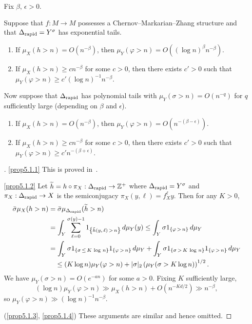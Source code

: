 \documentclass[10pt]{amsart}
\theoremstyle{definition}\newtheorem{defi}[theo]{Definition}\newtheorem{rema}[theo]{Remark}\newtheorem{exam}[theo]{Example}\newtheorem{exem}[theo]{Example}\newtheorem{nota}[theo]{Notation}
\newcommand{\Z}{\mathbb{Z}}
\newcommand{\DE}{\Delta_{\rm rapid}}
\newcommand{\eps}{\epsilon}
\newcommand*{\alphenumi}{\renewcommand*{\theenumi}{\alph{enumi}}}
\let\oldtilde\tilde
\renewcommand*{\tilde}[1]{\mathchoice{\widetilde{#1}}{\widetilde{#1}}{\oldtilde{#1}}{\oldtilde{#1}}}
\newenvironment{proofc}[1][\proofname]{\begin{proof}[#1]}{\end{proof}}
\begin{document}
\begin{prop}\label{prop:rough}
Fix $\beta,\,\eps>0$.

Suppose that $f:M\to M$ possesses a Chernov--Markarian--Zhang structure and that $\DE=Y^\sigma$ has exponential tails.
\begin{enumerate}\alphenumi
\item \label{prop5.1.1}If $\mu_X(h>n)=O(n^{-\beta})$, then $\mu_Y(\varphi>n)=O((\log n)^\beta n^{-\beta})$.
\item \label{prop5.1.2}If $\mu_X(h>n)\ge cn^{-\beta}$ for some $c>0$, then there exists $c'>0$ such that $\mu_Y(\varphi>n)\ge c'(\log n)^{-1}n^{-\beta}$.
\end{enumerate}

Now suppose that $\DE$ has polynomial tails with $\mu_Y(\sigma>n)=O(n^{-q})$ for $q$ sufficiently large (depending on $\beta$ and $\eps$).
\begin{enumerate}\alphenumi
\setcounter{enumi}{2}
\item \label{prop5.1.3}If $\mu_X(h>n)=O(n^{-\beta})$, then $\mu_Y(\varphi>n)=O(n^{-(\beta-\eps)})$.
\item \label{prop5.1.4}If $\mu_X(h>n)\ge cn^{-\beta}$ for some $c>0$, then there exists $c'>0$ such that $\mu_Y(\varphi>n)\ge c'n^{-(\beta+\eps)}$.
\end{enumerate}
\end{prop}

\begin{proofc}
\eqref{prop5.1.1} This is proved in~\cite{ChernovZhang05,Markarian04}.

\eqref{prop5.1.2} Let $\tilde h=h\circ\pi_X:\DE\to\Z^+$ where $\DE=Y^\sigma$ and $\pi_X:\DE\to X$ is the semiconjugacy $\pi_X(y,\ell)=f_X^\ell y$. Then for any $K>0$,
\begin{align*}
\bar\sigma\mu_X(h>n) &=\bar\sigma \mu_{\DE}(\tilde h>n)\\
&=\int_Y\sum_{\ell=0}^{\sigma(y)-1}1_{\left\{\tilde h(y,\,\ell)\,>\,n\right\}}\,d\mu_Y(y)\le \int_Y \sigma 1_{\left\{\varphi\,>\,n\right\}}\,d\mu_Y \\
& = \int_Y \sigma 1_{\left\{\sigma\,\le\,K\,\log\,n\right\}} 1_{\left\{\varphi\,>\,n\right\}}\,d\mu_Y + \int_Y \sigma 1_{\left\{\sigma\,>\,K\,\log\,n\right\}} 1_{\left\{\varphi\,>\,n\right\}}\,d\mu_Y
\\ & \quad\le (K\log n)\mu_Y(\varphi>n)+|\sigma|_2\left(\mu_Y(\sigma>K\log n)\right)^{1/2}.
\end{align*}
We have $\mu_Y(\sigma>n)=O(e^{-an})$ for some $a>0$. Fixing $K$ sufficiently large,
\[
(\log n)\mu_Y(\varphi>n) \gg \mu_X(h>n)+O\left(n^{-K d/2}\right)\gg n^{-\beta},
\]
so $\mu_Y(\varphi>n)\gg (\log n)^{-1}n^{-\beta}$.

(\ref{prop5.1.3}, \ref{prop5.1.4}) These arguments are similar and hence omitted.
\end{proofc}
\end{document}
